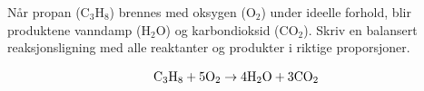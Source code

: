 

Når propan (C$_{3}$H$_{8}$) brennes med oksygen (O$_{2}$) under ideelle forhold, blir produktene vanndamp (H$_{2}$O) og karbondioksid (CO$_{2}$). Skriv en balansert reaksjonsligning med alle reaktanter og produkter i riktige proporsjoner.







$$\hbox{C}_3\hbox{H}_8 + \hbox{5O}_2 \to \hbox{4H}_2\hbox{O} + \hbox{3CO}_2$$










